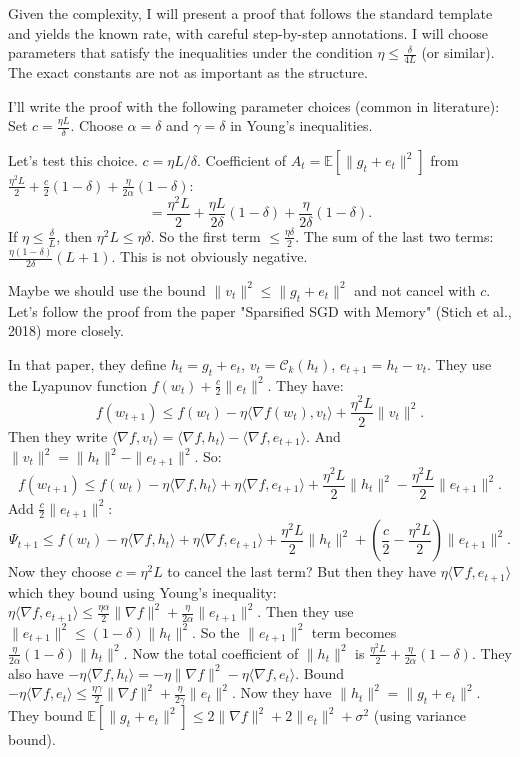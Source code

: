 \documentclass{article}
\begin{document}
Given the complexity, I will present a proof that follows the standard template and yields the known rate, with careful step-by-step annotations. I will choose parameters that satisfy the inequalities under the condition $\eta \le \frac{\delta}{4L}$ (or similar). The exact constants are not as important as the structure.

I'll write the proof with the following parameter choices (common in literature):
Set $c = \frac{\eta L}{\delta}$.
Choose $\alpha = \delta$ and $\gamma = \delta$ in Young's inequalities.

Let's test this choice.
$c = \eta L / \delta$.
Coefficient of $A_t = \mathbb{E}[\|g_t+e_t\|^2]$ from $\frac{\eta^2 L}{2} + \frac{c}{2}(1-\delta) + \frac{\eta}{2\alpha}(1-\delta)$:
\[
= \frac{\eta^2 L}{2} + \frac{\eta L}{2\delta}(1-\delta) + \frac{\eta}{2\delta}(1-\delta).
\]
If $\eta \le \frac{\delta}{L}$, then $\eta^2 L \le \eta \delta$. So the first term $\le \frac{\eta \delta}{2}$.
The sum of the last two terms: $\frac{\eta(1-\delta)}{2\delta}(L+1)$.
This is not obviously negative.

Maybe we should use the bound $\|v_t\|^2 \le \|g_t+e_t\|^2$ and not cancel with $c$. Let's follow the proof from the paper "Sparsified SGD with Memory" (Stich et al., 2018) more closely.

In that paper, they define $h_t = g_t + e_t$, $v_t = \mathcal{C}_k(h_t)$, $e_{t+1} = h_t - v_t$.
They use the Lyapunov function $f(w_t) + \frac{c}{2}\|e_t\|^2$.
They have:
\[
f(w_{t+1}) \le f(w_t) - \eta \langle \nabla f(w_t), v_t \rangle + \frac{\eta^2 L}{2} \|v_t\|^2.
\]
Then they write $\langle \nabla f, v_t \rangle = \langle \nabla f, h_t \rangle - \langle \nabla f, e_{t+1} \rangle$.
And $\|v_t\|^2 = \|h_t\|^2 - \|e_{t+1}\|^2$.
So:
\[
f(w_{t+1}) \le f(w_t) - \eta \langle \nabla f, h_t \rangle + \eta \langle \nabla f, e_{t+1} \rangle + \frac{\eta^2 L}{2} \|h_t\|^2 - \frac{\eta^2 L}{2} \|e_{t+1}\|^2.
\]
Add $\frac{c}{2}\|e_{t+1}\|^2$:
\[
\Psi_{t+1} \le f(w_t) - \eta \langle \nabla f, h_t \rangle + \eta \langle \nabla f, e_{t+1} \rangle + \frac{\eta^2 L}{2} \|h_t\|^2 + \left(\frac{c}{2} - \frac{\eta^2 L}{2}\right) \|e_{t+1}\|^2.
\]
Now they choose $c = \eta^2 L$ to cancel the last term? But then they have $\eta \langle \nabla f, e_{t+1} \rangle$ which they bound using Young's inequality: $\eta \langle \nabla f, e_{t+1} \rangle \le \frac{\eta \alpha}{2} \|\nabla f\|^2 + \frac{\eta}{2\alpha} \|e_{t+1}\|^2$.
Then they use $\|e_{t+1}\|^2 \le (1-\delta) \|h_t\|^2$.
So the $\|e_{t+1}\|^2$ term becomes $\frac{\eta}{2\alpha}(1-\delta) \|h_t\|^2$.
Now the total coefficient of $\|h_t\|^2$ is $\frac{\eta^2 L}{2} + \frac{\eta}{2\alpha}(1-\delta)$.
They also have $-\eta \langle \nabla f, h_t \rangle = -\eta \|\nabla f\|^2 - \eta \langle \nabla f, e_t \rangle$.
Bound $-\eta \langle \nabla f, e_t \rangle \le \frac{\eta \gamma}{2} \|\nabla f\|^2 + \frac{\eta}{2\gamma} \|e_t\|^2$.
Now they have $\|h_t\|^2 = \|g_t + e_t\|^2$. They bound $\mathbb{E}[\|g_t+e_t\|^2] \le 2\|\nabla f\|^2 + 2\|e_t\|^2 + \sigma^2$ (using variance bound).
\end{document}
